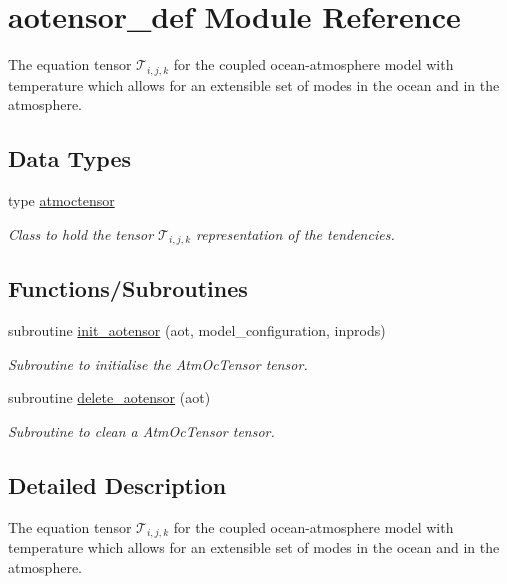 \hypertarget{namespaceaotensor__def}{}\section{aotensor\+\_\+def Module Reference}
\label{namespaceaotensor__def}


The equation tensor $\mathcal{T}_{i,j,k}$ for the coupled ocean-\/atmosphere model with temperature which allows for an extensible set of modes in the ocean and in the atmosphere.  


\subsection*{Data Types}
\begin{DoxyCompactItemize}
\item 
type \hyperlink{structaotensor__def_1_1atmoctensor}{atmoctensor}
\begin{DoxyCompactList}\small\item\em Class to hold the tensor $\mathcal{T}_{i,j,k}$ representation of the tendencies. \end{DoxyCompactList}\end{DoxyCompactItemize}
\subsection*{Functions/\+Subroutines}
\begin{DoxyCompactItemize}
\item 
subroutine \hyperlink{namespaceaotensor__def_af3321529da46b7dbd5792db9c397d4d7}{init\+\_\+aotensor} (aot, model\+\_\+configuration, inprods)
\begin{DoxyCompactList}\small\item\em Subroutine to initialise the Atm\+Oc\+Tensor tensor. \end{DoxyCompactList}\item 
subroutine \hyperlink{namespaceaotensor__def_a255887ee29cab31f0f875181adc8d18a}{delete\+\_\+aotensor} (aot)
\begin{DoxyCompactList}\small\item\em Subroutine to clean a Atm\+Oc\+Tensor tensor. \end{DoxyCompactList}\end{DoxyCompactItemize}


\subsection{Detailed Description}
The equation tensor $\mathcal{T}_{i,j,k}$ for the coupled ocean-\/atmosphere model with temperature which allows for an extensible set of modes in the ocean and in the atmosphere. 

